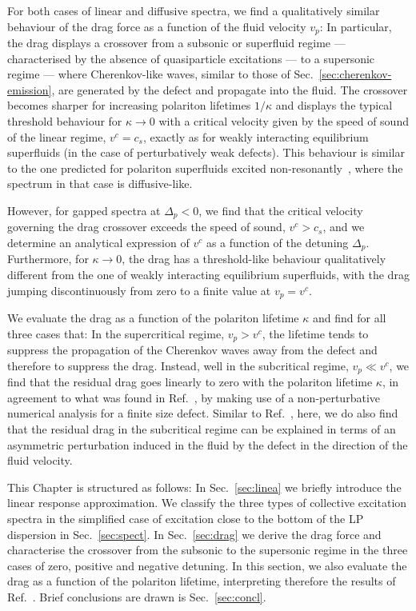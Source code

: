 For both cases of linear and diffusive spectra, we find a
qualitatively similar behaviour of the drag force as a function of the
fluid velocity $v_p$: In particular, the drag displays a crossover
from a subsonic or superfluid regime --- characterised by the absence
of quasiparticle excitations --- to a supersonic regime --- where
Cherenkov-like waves, similar to those of
Sec.~\ref{sec:cherenkov-emission}, are generated by the defect and
propagate into the fluid. The crossover becomes sharper for increasing
polariton lifetimes $1/\kappa$ and displays the typical threshold
behaviour for $\kappa \to 0$ with a critical velocity given by the
speed of sound of the linear regime, $v^c= c_s$, exactly as for weakly
interacting equilibrium superfluids (in the case of perturbatively
weak defects). This behaviour is similar to the one predicted for
polariton superfluids excited non-resonantly~\cite{Wouters_2010},
where the spectrum in that case is diffusive-like.

However, for gapped spectra at $\Delta_p <0$, we find that the
critical velocity governing the drag crossover exceeds the speed of
sound, $v^c > c_s$, and we determine an analytical expression of $v^c$
as a function of the detuning $\Delta_p$. Furthermore, for $\kappa \to 0$,
the drag has a threshold-like behaviour qualitatively different from
the one of weakly interacting equilibrium superfluids, with the drag
jumping discontinuously from zero to a finite value at $v_p=v^c$.

We evaluate the drag as a function of the polariton lifetime $\kappa$
and find for all three cases that: In the supercritical regime,
$v_p>v^c$, the lifetime tends to suppress the propagation of the
Cherenkov waves away from the defect and therefore to suppress the
drag. Instead, well in the subcritical regime, $v_p \ll v^c$, we find
that the residual drag goes linearly to zero with the polariton
lifetime $\kappa$, in agreement to what  was found in
Ref.~\cite{Cancellieri_2010}, by making use of a non-perturbative
numerical analysis for a finite size defect. Similar to
Ref.~\cite{Cancellieri_2010}, here, we do also find that the residual
drag in the subcritical regime can be explained in terms of an
asymmetric perturbation induced in the fluid by the defect in the
direction of the fluid velocity.

This Chapter is structured as follows: In Sec.~\ref{sec:linea} we
briefly introduce the linear response approximation. We classify the
three types of collective excitation spectra in the simplified case of
excitation close to the bottom of the LP dispersion in
Sec.~\ref{sec:spect}. In Sec.~\ref{sec:drag} we derive the drag force
and characterise the crossover from the subsonic to the supersonic
regime in the three cases of zero, positive and negative detuning. In
this section, we also evaluate the drag as a function of the polariton
lifetime, interpreting therefore the results of
Ref.~\cite{Cancellieri_2010}.  Brief conclusions are drawn is
Sec.~\ref{sec:concl}.


